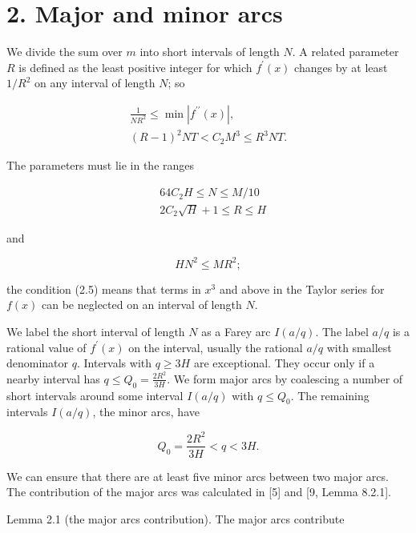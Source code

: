 \documentclass[10pt]{article}
\begin{document}
\section*{2. Major and minor arcs}
We divide the sum over $m$ into short intervals of length $N$. A related parameter $R$ is defined as the least positive integer for which $f^{\prime}(x)$ changes by at least $1 / R^{2}$ on any interval of length $N$; so


\begin{gather*}
\frac{1}{N R^{2}} \leqslant \min \left|f^{\prime \prime}(x)\right|,  \tag{2.1}\\
(R-1)^{2} N T<C_{2} M^{3} \leqslant R^{3} N T. \tag{2.2}
\end{gather*}


The parameters must lie in the ranges


\begin{align*}
& 64 C_{2} H \leqslant N \leqslant M / 10  \tag{2.3}\\
& 2 C_{2} \sqrt{H}+1 \leqslant R \leqslant H \tag{2.4}
\end{align*}


and


\begin{equation*}
H N^{2} \leqslant M R^{2}; \tag{2.5}
\end{equation*}


the condition (2.5) means that terms in $x^{3}$ and above in the Taylor series for $f(x)$ can be neglected on an interval of length $N$.

We label the short interval of length $N$ as a Farey arc $I(a / q)$. The label $a / q$ is a rational value of $f^{\prime}(x)$ on the interval, usually the rational $a / q$ with smallest denominator $q$. Intervals with $q \geqslant 3 H$ are exceptional. They occur only if a nearby interval has $q \leqslant Q_{0}=\frac{2R^{2}}{3H}$. We form major arcs by coalescing a number of short intervals around some interval $I(a / q)$ with $q \leqslant Q_{0}$. The remaining intervals $I(a / q)$, the minor arcs, have


\begin{equation*}
Q_{0}=\frac{2R^{2}}{3H}<q<3H. \tag{2.6}
\end{equation*}


We can ensure that there are at least five minor arcs between two major arcs. The contribution of the major arcs was calculated in [5] and [9, Lemma 8.2.1].

Lemma 2.1 (the major arcs contribution). The major arcs contribute
\end{document}
